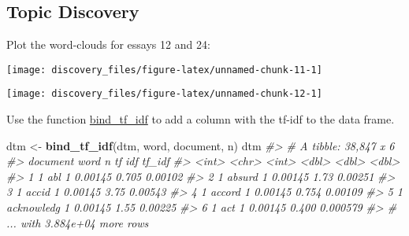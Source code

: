 \documentclass[]{book}
\newenvironment{Shaded}{\begin{snugshade}}{\end{snugshade}}
\newcommand{\CommentTok}[1]{\textcolor[rgb]{0.56,0.35,0.01}{\textit{#1}}}
\newcommand{\DataTypeTok}[1]{\textcolor[rgb]{0.13,0.29,0.53}{#1}}
\newcommand{\DecValTok}[1]{\textcolor[rgb]{0.00,0.00,0.81}{#1}}
\newcommand{\KeywordTok}[1]{\textcolor[rgb]{0.13,0.29,0.53}{\textbf{#1}}}
\newcommand{\NormalTok}[1]{#1}
\newcommand{\OperatorTok}[1]{\textcolor[rgb]{0.81,0.36,0.00}{\textbf{#1}}}
\newcommand{\StringTok}[1]{\textcolor[rgb]{0.31,0.60,0.02}{#1}}
\theoremstyle{definition}
\theoremstyle{definition}
\theoremstyle{definition}
\theoremstyle{remark}
\begin{document}
\hypertarget{topic-discovery}{%
\subsection{Topic Discovery}\label{topic-discovery}}

Plot the word-clouds for essays 12 and 24:

\begin{Shaded}
\end{Shaded}

\begin{center}\texttt{[image: discovery\_files/figure-latex/unnamed-chunk-11-1]} \end{center}

\begin{Shaded}
\end{Shaded}

\begin{center}\texttt{[image: discovery\_files/figure-latex/unnamed-chunk-12-1]} \end{center}

Use the function
\href{https://www.rdocumentation.org/packages/tidytext/topics/bind_tf_idf}{bind\_tf\_idf}
to add a column with the tf-idf to the data frame.

\begin{Shaded}
\begin{Highlighting}[]
\NormalTok{dtm <-}\StringTok{ }\KeywordTok{bind_tf_idf}\NormalTok{(dtm, word, document, n)}
\NormalTok{dtm}
\CommentTok{#> # A tibble: 38,847 x 6}
\CommentTok{#>   document word           n      tf   idf   tf_idf}
\CommentTok{#>      <int> <chr>      <int>   <dbl> <dbl>    <dbl>}
\CommentTok{#> 1        1 abl            1 0.00145 0.705 0.00102 }
\CommentTok{#> 2        1 absurd         1 0.00145 1.73  0.00251 }
\CommentTok{#> 3        1 accid          1 0.00145 3.75  0.00543 }
\CommentTok{#> 4        1 accord         1 0.00145 0.754 0.00109 }
\CommentTok{#> 5        1 acknowledg     1 0.00145 1.55  0.00225 }
\CommentTok{#> 6        1 act            1 0.00145 0.400 0.000579}
\CommentTok{#> # ... with 3.884e+04 more rows}
\end{Highlighting}
\end{Shaded}
\end{document}
